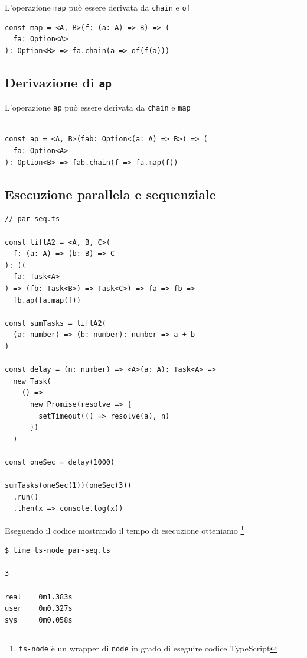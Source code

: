 \documentclass[12pt]{article}
\begin{document}
L'operazione \texttt{map} può essere derivata da \texttt{chain} e \texttt{of}

\begin{verbatim}
const map = <A, B>(f: (a: A) => B) => (
  fa: Option<A>
): Option<B> => fa.chain(a => of(f(a)))
\end{verbatim}

\subsection{Derivazione di \texttt{ap}}

L'operazione \texttt{ap} può essere derivata da \texttt{chain} e \texttt{map}

\begin{verbatim}

const ap = <A, B>(fab: Option<(a: A) => B>) => (
  fa: Option<A>
): Option<B> => fab.chain(f => fa.map(f))
\end{verbatim}

\subsection{Esecuzione parallela e sequenziale}

\begin{verbatim}
// par-seq.ts

const liftA2 = <A, B, C>(
  f: (a: A) => (b: B) => C
): ((
  fa: Task<A>
) => (fb: Task<B>) => Task<C>) => fa => fb =>
  fb.ap(fa.map(f))

const sumTasks = liftA2(
  (a: number) => (b: number): number => a + b
)

const delay = (n: number) => <A>(a: A): Task<A> =>
  new Task(
    () =>
      new Promise(resolve => {
        setTimeout(() => resolve(a), n)
      })
  )

const oneSec = delay(1000)

sumTasks(oneSec(1))(oneSec(3))
  .run()
  .then(x => console.log(x))
\end{verbatim}

Eseguendo il codice mostrando il tempo di esecuzione otteniamo
\footnote{\texttt{ts-node} è un wrapper di \texttt{node} in grado di eseguire codice TypeScript}

\begin{verbatim}
$ time ts-node par-seq.ts

3

real    0m1.383s
user    0m0.327s
sys     0m0.058s
\end{verbatim}
\end{document}
